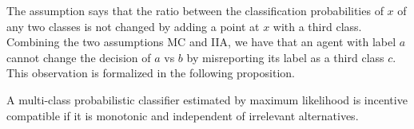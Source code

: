 \documentclass{article}
\begin{document}
The assumption says that the ratio between the classification probabilities of $x $ of any two classes is not changed by adding a point at $x $ with a third class.
\newline \newline
Combining the two assumptions MC and IIA, we have that an agent with label $a $ cannot change the decision of $a $ vs $b $ by misreporting its label as a third class $c $. This observation is formalized in the following proposition.
\newline \newline
\begin{prop} \label{prop:margin} 
A multi-class probabilistic classifier estimated by maximum likelihood is incentive compatible if it is monotonic and independent of irrelevant alternatives.
\end{prop}
\end{document}
